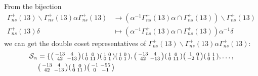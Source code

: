 \begin{itemize}
From the bijection \begin{align*} \Gamma_{ns}^+(13)\backslash \Gamma_{ns}^+(13) \alpha \Gamma_{ns}^+(13) &\rightarrow (\alpha^{-1} \Gamma_{ns}^+(13) \alpha \cap \Gamma_{ns}^+(13)) \backslash \Gamma_{ns}^+(13) \\ \Gamma_{ns}^+(13) \delta &\mapsto (\alpha^{-1} \Gamma_{ns}^+(13) \alpha \cap \Gamma_{ns}^+(13)) \alpha^{-1} \delta \end{align*} we can get the double coset representatives of $\Gamma_{ns}^+(13)\backslash \Gamma_{ns}^+(13) \alpha \Gamma_{ns}^+(13)$: \begin{align*}
\mathcal{S}_\alpha &= \{
\begin{psmallmatrix}
-13 & 4 \\ 42 & -13
\end{psmallmatrix}
\begin{psmallmatrix}
1 & 0 \\ 0 & 11
\end{psmallmatrix}
\begin{psmallmatrix}
1 & 0 \\ 0 & 1
\end{psmallmatrix}
\begin{psmallmatrix}
1 & 0 \\ 0 & 1
\end{psmallmatrix},
\begin{psmallmatrix}
-13 & 4 \\ 42 & -13
\end{psmallmatrix}
\begin{psmallmatrix}
1 & 0 \\ 0 & 11
\end{psmallmatrix}
\begin{psmallmatrix}
1 & 0 \\ -2 & 1
\end{psmallmatrix}
\begin{psmallmatrix}
1 & 1 \\ 0 & 1
\end{psmallmatrix},
\ldots, \\ & \begin{psmallmatrix}
-13 & 4 \\ 42 & -13
\end{psmallmatrix}
\begin{psmallmatrix}
1 & 0 \\ 0 & 11
\end{psmallmatrix}
\begin{psmallmatrix}
-1 & -55 \\ 0 & -1

\end{psmallmatrix}
\end{align*}
\end{itemize}
